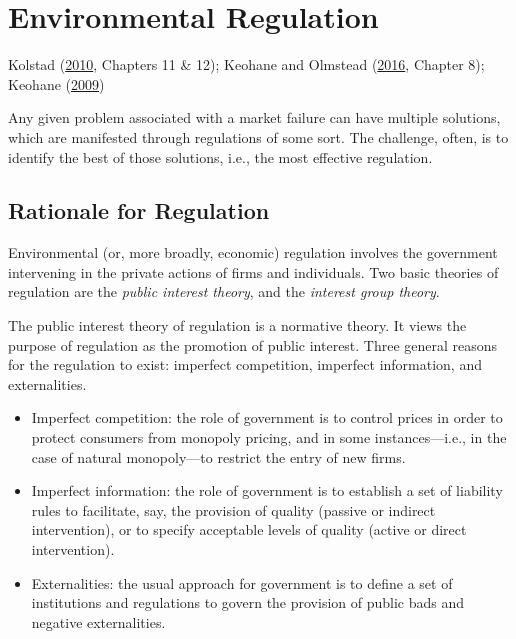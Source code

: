 \documentclass[
]{book}
\providecommand{\tightlist}{%
  \setlength{\itemsep}{0pt}\setlength{\parskip}{0pt}}
\begin{document}
\hypertarget{environmental-regulation}{%
\chapter{Environmental Regulation}\label{environmental-regulation}}

Kolstad (\protect\hyperlink{ref-kolstad2010}{2010}, Chapters 11 \& 12); Keohane and Olmstead (\protect\hyperlink{ref-keohane2016}{2016}, Chapter 8); Keohane (\protect\hyperlink{ref-keohane2009}{2009})

Any given problem associated with a market failure can have multiple solutions, which are manifested through regulations of some sort. The challenge, often, is to identify the best of those solutions, i.e., the most effective regulation.

\hypertarget{rationale-for-regulation}{%
\section{Rationale for Regulation}\label{rationale-for-regulation}}

Environmental (or, more broadly, economic) regulation involves the government intervening in the private actions of firms and individuals. Two basic theories of regulation are the \emph{public interest theory}, and the \emph{interest group theory}.

The public interest theory of regulation is a normative theory. It views the purpose of regulation as the promotion of public interest. Three general reasons for the regulation to exist: imperfect competition, imperfect information, and externalities.

\begin{itemize}
\tightlist
\item
  Imperfect competition: the role of government is to control prices in order to protect consumers from monopoly pricing, and in some instances---i.e., in the case of natural monopoly---to restrict the entry of new firms.
\item
  Imperfect information: the role of government is to establish a set of liability rules to facilitate, say, the provision of quality (passive or indirect intervention), or to specify acceptable levels of quality (active or direct intervention).
\item
  Externalities: the usual approach for government is to define a set of institutions and regulations to govern the provision of public bads and negative externalities.
\end{itemize}
\end{document}
